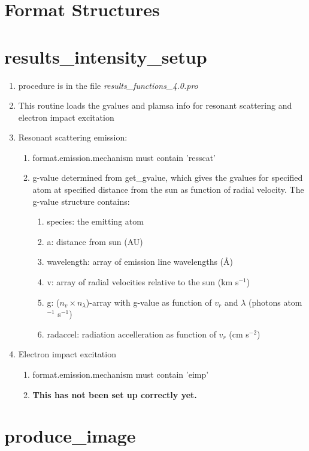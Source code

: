 \documentclass[11pt]{article}
\begin{document}
\section{Format Structures \label{format}}

\section{results\_intensity\_setup \label{intensitysetup}}
\begin{enumerate}
\item procedure is in the file \textit{results\_functions\_4.0.pro}
\item This routine loads the gvalues and plamsa info for resonant scattering
and electron impact excitation
\item Resonant scattering emission:
  \begin{enumerate}
  \item format.emission.mechanism must contain 'resscat'
  \item g-value determined from {\color{blue}get\_gvalue}, which gives the
  gvalues for specified atom at specified distance from the sun as function of
  radial velocity. The g-value structure contains:
    \begin{enumerate}
    \item species: the emitting atom
    \item a: distance from sun (AU)
    \item wavelength: array of emission line wavelengths (\AA)
    \item v: array of radial velocities relative to the sun (km s$^{-1}$)
    \item g: ($n_v \times n_\lambda$)-array with g-value as function of $v_r$ 
    and $\lambda$ (photons atom$^{-1}$ s$^{-1}$)
    \item radaccel: radiation accelleration as function of $v_r$ (cm s$^{-2}$)
    \end{enumerate}
  \end{enumerate}
\item Electron impact excitation
  \begin{enumerate}
  \item format.emission.mechanism must contain 'eimp'
  \item \textbf{This has not been set up correctly yet.}
  \end{enumerate}
\end{enumerate}

\section{produce\_image \label{image}}
\end{document}
